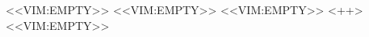 \documentclass[paper=a4,pagesize,11pt,draft=false]{scrartcl}
\begin{document}
<<VIM:EMPTY>>
<<VIM:EMPTY>>
<<VIM:EMPTY>>
<++>
<<VIM:EMPTY>>
\end{document}
